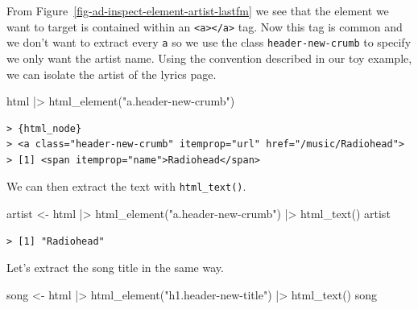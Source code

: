 \documentclass[
  letterpaper,
]{latex/krantz}
\newenvironment{Shaded}{\begin{snugshade}}{\end{snugshade}}
\newcommand{\FunctionTok}[1]{\textcolor[rgb]{0.00,0.00,0.00}{#1}}
\newcommand{\NormalTok}[1]{\textcolor[rgb]{0.00,0.00,0.00}{#1}}
\newcommand{\OtherTok}[1]{\textcolor[rgb]{0.00,0.00,0.00}{#1}}
\newcommand{\SpecialCharTok}[1]{\textcolor[rgb]{0.00,0.00,0.00}{#1}}
\newcommand{\StringTok}[1]{\textcolor[rgb]{0.00,0.00,0.00}{#1}}
\begin{document}
From Figure~\ref{fig-ad-inspect-element-artist-lastfm} we see that the
element we want to target is contained within an
\texttt{\textless{}a\textgreater{}\textless{}/a\textgreater{}} tag. Now
this tag is common and we don't want to extract every \texttt{a} so we
use the class \texttt{header-new-crumb} to specify we only want the
artist name. Using the convention described in our toy example, we can
isolate the artist of the lyrics page.

\begin{Shaded}
\begin{Highlighting}[]
\NormalTok{html }\SpecialCharTok{|\textgreater{}} 
  \FunctionTok{html\_element}\NormalTok{(}\StringTok{"a.header{-}new{-}crumb"}\NormalTok{)}
\end{Highlighting}
\end{Shaded}

\begin{verbatim}
> {html_node}
> <a class="header-new-crumb" itemprop="url" href="/music/Radiohead">
> [1] <span itemprop="name">Radiohead</span>
\end{verbatim}

We can then extract the text with \texttt{html\_text()}.

\begin{Shaded}
\begin{Highlighting}[]
\NormalTok{artist }\OtherTok{\textless{}{-}} 
\NormalTok{  html }\SpecialCharTok{|\textgreater{}} 
  \FunctionTok{html\_element}\NormalTok{(}\StringTok{"a.header{-}new{-}crumb"}\NormalTok{) }\SpecialCharTok{|\textgreater{}} 
  \FunctionTok{html\_text}\NormalTok{()}
\NormalTok{artist}
\end{Highlighting}
\end{Shaded}

\begin{verbatim}
> [1] "Radiohead"
\end{verbatim}

Let's extract the song title in the same way.

\begin{Shaded}
\begin{Highlighting}[]
\NormalTok{song }\OtherTok{\textless{}{-}} 
\NormalTok{  html }\SpecialCharTok{|\textgreater{}} 
  \FunctionTok{html\_element}\NormalTok{(}\StringTok{"h1.header{-}new{-}title"}\NormalTok{) }\SpecialCharTok{|\textgreater{}} 
  \FunctionTok{html\_text}\NormalTok{()}
\NormalTok{song}
\end{Highlighting}
\end{Shaded}
\end{document}
